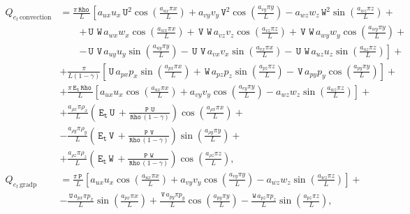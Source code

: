 \documentclass[10pt]{article}
\newcommand{\Rho}{\,\mathtt{Rho}}
\newcommand{\PP}{\,\mathtt{P}}
\newcommand{\U}{\,\mathtt{U}}
\newcommand{\V}{\,\mathtt{V}}
\newcommand{\W}{\,\mathtt{W}}
\newcommand{\Et}{\,\mathtt{E_t}}
\begin{document}
%
%
\begin{equation*}
 \begin{split}
 Q_{e_t \, \text{convection}}&= 
\frac{\pi \Rho \, }{L} \left[a_{ux} u_{x} \U^{2} \cos\left(\frac{a_{ux} \pi x}{L}\right) + a_{vy} v_{y} \V^{2} \cos\left(\frac{a_{vy} \pi y}{L}\right) - a_{wz} w_{z} \W^{2} \sin\left(\frac{a_{wz} \pi z}{L}\right)+\right.\\
 &\qquad\left. + \U \, \W \, a_{wx} w_{x} \cos\left(\frac{a_{wx} \pi x}{L}\right) + \V \, \W \, a_{vz} v_{z} \cos\left(\frac{a_{vz} \pi z}{L}\right) + \V \, \W \, a_{wy} w_{y} \cos\left(\frac{a_{wy} \pi y}{L}\right) +\right.\\
 &\qquad\left.- \U \, \V \, a_{uy} u_{y} \sin\left(\frac{a_{uy} \pi y}{L}\right) - \U \, \V \, a_{vx} v_{x} \sin\left(\frac{a_{vx} \pi x}{L}\right) - \U \, \W \, a_{uz} u_{z} \sin\left(\frac{a_{uz} \pi z}{L}\right)\right] + \\ 
&+ \frac{\pi }{L \left(1 - \gamma\right)}\left[\U \, a_{px} p_{x} \sin\left(\frac{a_{px} \pi x}{L}\right) + \W \, a_{pz} p_{z} \sin\left(\frac{a_{pz} \pi z}{L}\right) - \V \, a_{py} p_{y} \cos\left(\frac{a_{py} \pi y}{L}\right)\right] +\\ 
&+ \frac{\pi \Et \Rho \, }{L} \left[a_{ux} u_{x} \cos\left(\frac{a_{ux} \pi x}{L}\right) + a_{vy} v_{y} \cos\left(\frac{a_{vy} \pi y}{L}\right) - a_{wz} w_{z} \sin\left(\frac{a_{wz} \pi z}{L}\right)\right] + \\ 
&+ \frac{a_{\rho x} \pi \rho_{x} }{L} \left(\Et \U \, + \frac{\PP \, \U}{\Rho \, \left(1 - \gamma\right)}\right) \cos\left(\frac{a_{\rho x} \pi x}{L}\right) + \\ 
&- \frac{a_{\rho y} \pi \rho_{y} }{L} \left(\Et \V \, + \frac{\PP \, \V}{\Rho \, \left(1 - \gamma\right)}\right) \sin\left(\frac{a_{\rho y} \pi y}{L}\right) + \\ 
&+ \frac{a_{\rho z} \pi \rho_{z} }{L} \left(\Et \W \, + \frac{\PP \, \W}{\Rho \, \left(1 - \gamma\right)}\right) \cos\left(\frac{a_{\rho z} \pi z}{L}\right)
,\\
%
%
 Q_{e_t \, \text{gradp}}&= 
\frac{\pi \PP \, }{L} \left[a_{ux} u_{x} \cos\left(\frac{a_{ux} \pi x}{L}\right) + a_{vy} v_{y} \cos\left(\frac{a_{vy} \pi y}{L}\right) - a_{wz} w_{z} \sin\left(\frac{a_{wz} \pi z}{L}\right)\right]+ \\ 
&- \frac{\U \, a_{px} \pi p_{x} }{L}\sin\left(\frac{a_{px} \pi x}{L}\right)+ \frac{\V \, a_{py} \pi p_{y} }{L}\cos\left(\frac{a_{py} \pi y}{L}\right) - \frac{\W \, a_{pz}\pi p_{z} }{L}\sin\left(\frac{a_{pz} \pi z}{L}\right)
,\\

\end{split}
\end{equation*}
\end{document}
